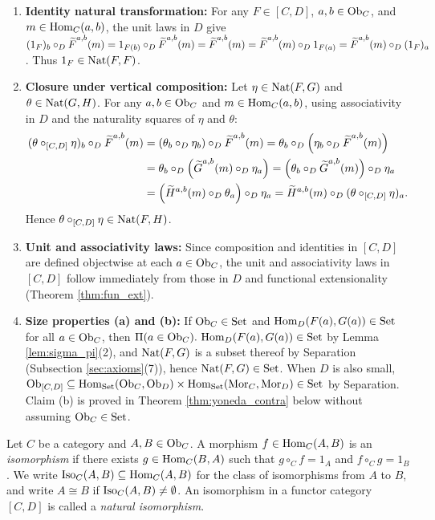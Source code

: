 \documentclass[10pt,a4paper]{article}
\begin{document}
\begin{enumerate}
\item \textbf{Identity natural transformation:} For any $F \in [C, D]$, $a, b \in {\textrm{Ob}}_C$, and $m \in {\textrm{Hom}}_C(a,b)$, the unit laws in $D$ give $(1_F)_b \circ_D {\widetilde{F}\textrm{}}^{a,b}(m) = 1_{F(b)} \circ_D {\widetilde{F}\textrm{}}^{a,b}(m) = {\widetilde{F}\textrm{}}^{a,b}(m) = {\widetilde{F}\textrm{}}^{a,b}(m) \circ_D 1_{F(a)} = {\widetilde{F}\textrm{}}^{a,b}(m) \circ_D (1_F)_a$. Thus $1_F \in {\textrm{Nat}}(F, F)$.
\item \textbf{Closure under vertical composition:} Let $\eta \in {\textrm{Nat}}(F, G)$ and $\theta \in {\textrm{Nat}}(G, H)$. For any $a, b \in {\textrm{Ob}}_C$ and $m \in {\textrm{Hom}}_C(a,b)$, using associativity in $D$ and the naturality squares of $\eta$ and $\theta$:
\begin{align*}
(\theta \circ_{[C,D]} \eta)_b \circ_D {\widetilde{F}\textrm{}}^{a,b}(m) &= (\theta_b \circ_D \eta_b) \circ_D {\widetilde{F}\textrm{}}^{a,b}(m) = \theta_b \circ_D \left(\eta_b \circ_D {\widetilde{F}\textrm{}}^{a,b}(m)\right) \\
&= \theta_b \circ_D \left({\widetilde{G}\textrm{}}^{a,b}(m) \circ_D \eta_a\right) = \left(\theta_b \circ_D {\widetilde{G}\textrm{}}^{a,b}(m)\right) \circ_D \eta_a \\
&= \left(\widetilde{H}^{a,b}(m) \circ_D \theta_a\right) \circ_D \eta_a = \widetilde{H}^{a,b}(m) \circ_D (\theta \circ_{[C,D]} \eta)_a.
\end{align*}
Hence $\theta \circ_{[C,D]} \eta \in {\textrm{Nat}}(F, H)$.
\item \textbf{Unit and associativity laws:} Since composition and identities in $[C, D]$ are defined objectwise at each $a \in {\textrm{Ob}}_C$, the unit and associativity laws in $[C, D]$ follow immediately from those in $D$ and functional extensionality (Theorem \ref{thm:fun_ext}).
\item \textbf{Size properties (a) and (b):} If ${\textrm{Ob}}_C \in {\textrm{Set}}$ and ${\textrm{Hom}}_D(F(a), G(a)) \in {\textrm{Set}}$ for all $a \in {\textrm{Ob}}_C$, then $\Pi(a \in {\textrm{Ob}}_C).\ {\textrm{Hom}}_D(F(a), G(a)) \in {\textrm{Set}}$ by Lemma \ref{lem:sigma_pi}(2), and ${\textrm{Nat}}(F, G)$ is a subset thereof by Separation (Subsection \ref{sec:axioms}(7)), hence ${\textrm{Nat}}(F, G) \in {\textrm{Set}}$. When $D$ is also small, ${\textrm{Ob}}_{[C,D]} \subseteq {\textrm{Hom}}_{\textrm{Set}}({\textrm{Ob}}_C, {\textrm{Ob}}_D) \times {\textrm{Hom}}_{\textrm{Set}}({\textrm{Mor}}_C, {\textrm{Mor}}_D) \in {\textrm{Set}}$ by Separation. Claim (b) is proved in Theorem \ref{thm:yoneda_contra} below without assuming ${\textrm{Ob}}_C \in {\textrm{Set}}$.
\end{enumerate}
\myqed

\begin{definition}\label{def:iso}
Let $C$ be a category and $A, B \in {\textrm{Ob}}_C$. A morphism $f \in {\textrm{Hom}}_C(A, B)$ is an \emph{isomorphism} if there exists $g \in {\textrm{Hom}}_C(B, A)$ such that $g \circ_C f = 1_A$ and $f \circ_C g = 1_B$. We write ${\mathrm{Iso}}_C(A, B) \subseteq {\textrm{Hom}}_C(A, B)$ for the class of isomorphisms from $A$ to $B$, and write $A \cong B$ if ${\mathrm{Iso}}_C(A, B) \neq \emptyset$. An isomorphism in a functor category $[C, D]$ is called a \emph{natural isomorphism}.
\end{definition}
\end{document}
